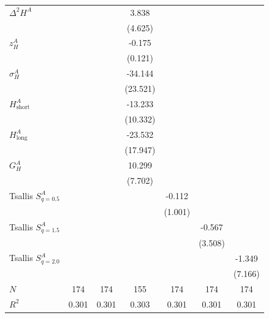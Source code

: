 \begin{table}[htbp]
\begin{tabular}{lcccccc}
  $\Delta^2 H^A$ &  &  & 3.838 &  &  &  \\
  &  &  & (4.625) &  &  &  \\[2pt]
  $z^A_H$ &  &  & -0.175 &  &  &  \\
  &  &  & (0.121) &  &  &  \\[2pt]
  $\sigma^A_H$ &  &  & -34.144 &  &  &  \\
  &  &  & (23.521) &  &  &  \\[2pt]
  $H^A_{\mathrm{short}}$ &  &  & -13.233 &  &  &  \\
  &  &  & (10.332) &  &  &  \\[2pt]
  $H^A_{\mathrm{long}}$ &  &  & -23.532 &  &  &  \\
  &  &  & (17.947) &  &  &  \\[2pt]
  $G^A_H$ &  &  & 10.299 &  &  &  \\
  &  &  & (7.702) &  &  &  \\[2pt]
  Tsallis $S^A_{q=0.5}$ &  &  &  & -0.112 &  &  \\
  &  &  &  & (1.001) &  &  \\[2pt]
  Tsallis $S^A_{q=1.5}$ &  &  &  &  & -0.567 &  \\
  &  &  &  &  & (3.508) &  \\[2pt]
  Tsallis $S^A_{q=2.0}$ &  &  &  &  &  & -1.349 \\
  &  &  &  &  &  & (7.166) \\[2pt]
\midrule
  $N$ & 174 & 174 & 155 & 174 & 174 & 174 \\
  $R^2$ & 0.301 & 0.301 & 0.303 & 0.301 & 0.301 & 0.301 \\
\bottomrule
\end{tabular}
\end{table}